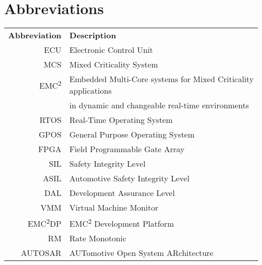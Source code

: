 \chapter*{Abbreviations}
\begin{tabular}{r l}
\textbf{Abbreviation} 	& \textbf{Description} \vspace{.5em} \\
ECU		&Electronic Control Unit\\
MCS		&Mixed Criticality System\\
EMC\textsuperscript{2}	&Embedded Multi-Core systems for Mixed Criticality applications\\
 		&in dynamic and changeable real-time environments\\
RTOS	&Real-Time Operating System\\
GPOS	&General Purpose Operating System\\
FPGA	&Field Programmable Gate Array\\
SIL		&Safety Integrity Level\\
ASIL	&Automotive Safety Integrity Level\\
DAL		&Development Assurance Level\\
VMM		&Virtual Machine Monitor\\
EMC\textsuperscript{2}DP	&EMC\textsuperscript{2} Development Platform\\
RM		&Rate Monotonic\\
AUTOSAR	&AUTomotive Open System ARchitecture\\

\end{tabular}